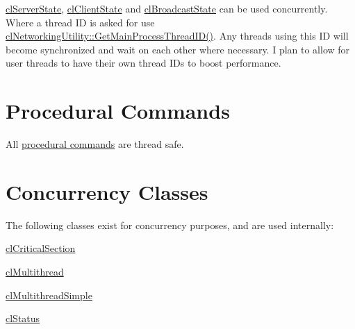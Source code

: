 \hyperlink{classcl_server_state}{clServerState}, \hyperlink{classcl_client_state}{clClientState} and \hyperlink{classcl_broadcast_state}{clBroadcastState} can be used concurrently. Where a thread ID is asked for use \hyperlink{classcl_networking_utility_acb6168b9acdc70baeb9bc0fe7c5196bb}{clNetworkingUtility::GetMainProcessThreadID()}. Any threads using this ID will become synchronized and wait on each other where necessary. I plan to allow for user threads to have their own thread IDs to boost performance. \par
\par
\hypertarget{multithreadingpage_mtProcedural}{}\section{Procedural Commands}\label{multithreadingpage_mtProcedural}
All \hyperlink{group__proc_commands}{procedural commands} are thread safe.\par
\par
\hypertarget{multithreadingpage_mtClasses}{}\section{Concurrency Classes}\label{multithreadingpage_mtClasses}
The following classes exist for concurrency purposes, and are used internally:
\begin{DoxyItemize}
\item \hyperlink{classcl_critical_section}{clCriticalSection}
\item \hyperlink{classcl_multithread}{clMultithread}
\item \hyperlink{classcl_multithread_simple}{clMultithreadSimple}
\item \hyperlink{classcl_status}{clStatus} 
\end{DoxyItemize}